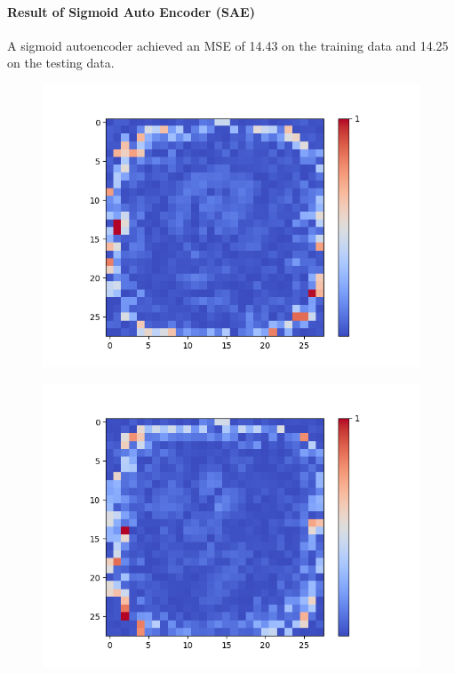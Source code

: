 \begin{figure}[H]
\begin{minipage}[b]{0.19\textwidth}
		\label{}
	\end{minipage}
	
	\hfill
\end{figure}

\paragraph{Result of Sigmoid Auto Encoder (SAE)}
A sigmoid autoencoder achieved an MSE of 14.43 on the training data and 14.25 on the testing data.

\begin{figure}[H]
	\captionsetup{labelformat=empty}
	\centering
	\begin{minipage}[b]{0.19\textwidth}
		\includegraphics[width=\textwidth]{SAE(20LF)/Feature-0.png}
		\label{}
	\end{minipage}
	\begin{minipage}[b]{0.19\textwidth}
		\includegraphics[width=\textwidth]{SAE(20LF)/Feature-6.png}

\end{minipage}
\end{figure}
